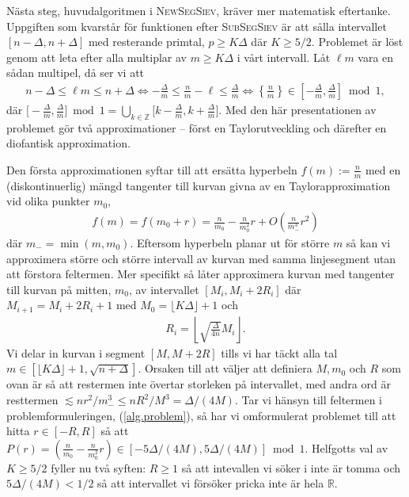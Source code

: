 Nästa steg, huvudalgoritmen i \textsc{NewSegSiev}, kräver mer matematisk eftertanke. Uppgiften som kvarstår för funktionen efter \textsc{SubSegSiev} är att sålla intervallet \([n - \Delta, n + \Delta]\) med resterande primtal, \( p \geq K \Delta\) där \(K \geq 5/2\). Problemet är löst genom att leta efter alla multiplar av \(m \geq K \Delta\) i vårt intervall. Låt \(\ell m\) vara en sådan multipel, då ser vi att
\begin{align} \label{alg.problem}
    n - \Delta \leq \ell m \leq n + \Delta \Longleftrightarrow 
    - \frac{\Delta}{m} \leq \frac{n}{m} - \ell \leq \frac{\Delta}{m} \Longleftrightarrow \left\{ \frac{n}{m} \right\} \in \left[- \frac{\Delta}{m}, \frac{\Delta}{m} \right] \bmod 1,
\end{align}
där $\big[- \frac{\Delta}{m}, \frac{\Delta}{m} \big] \bmod 1 = \bigcup_{k \in \mathbb{Z}} \big[k - \frac{\Delta}{m}, k + \frac{\Delta}{m} \big]$. Med den här presentationen av problemet gör \cite{HaraldSieve} två approximationer -- först en Taylorutveckling och därefter en diofantisk approximation. 

Den första approximationen syftar till att ersätta hyperbeln \(f(m) := \frac{n}{m}\) med en (diskontinuerlig) mängd tangenter till kurvan givna av en Taylorapproximation vid olika punkter \(m_0\),
\begin{align*}
    f(m) = f(m_0 + r) = \frac{n}{m_0} - \frac{n}{m_0^2} r + O\left(\frac{n}{m_-^3} r^2 \right)
\end{align*} %
där \(m_- = \min(m, m_0)\). Eftersom hyperbeln planar ut för större $m$ så kan vi approximera större och större intervall av kurvan med samma linjesegment utan att förstora feltermen. Mer specifikt så låter \cite{HaraldSieve} approximera kurvan med tangenter till kurvan på mitten, $m_0$, av intervallet \([M_i, M_i + 2R_i]\) där  $M_{i + 1} = M_i + 2R_i + 1$ med $M_0 = \lfloor K \Delta \rfloor + 1$ och
\begin{align*}
    R_i = \left\lfloor \sqrt{\frac{\Delta}{4n}} M_i \right\rfloor .
\end{align*}
Vi delar in kurvan i segment \([M, M + 2R]\) tills vi har täckt alla tal \(m \in [  \lfloor K \Delta \rfloor + 1, \sqrt{n + \Delta}]\). Orsaken till att \cite{HaraldSieve} väljer att definiera \(M, m_0\) och \(R\) som ovan är så att restermen inte övertar storleken på intervallet, med andra ord är resttermen \(\lesssim nr^2/m_-^3 \leq nR^2/M^3 = \Delta / (4M)\). Tar vi hänsyn till feltermen i problemformuleringen, (\ref{alg.problem}), så har vi omformulerat problemet till att hitta \(r \in [-R, R]\) så att \(P(r) = (\frac{n}{m_0} - \frac{n}{m_0^2} r) \in [-5\Delta/(4M), 5\Delta/(4M)] \bmod{1}\). Helfgotts val av \(K \geq 5/2\) fyller nu två syften: \(R \geq 1\) så att intevallen vi söker i inte är tomma och \(5\Delta/(4M) < 1/2\) så att intervallet vi försöker pricka inte är hela \(\mathbb{R}\).

